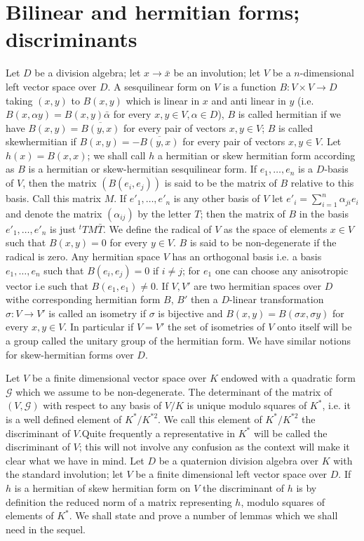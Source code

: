  \section{Bilinear and hermitian forms; discriminants}\label{chap2:sec2.6}
 
 Let $D$ be a division algebra; let $x \rightarrow \bar{x}$ be an
 involution; let $V$ be a $n$-dimensional left vector space over
 $D$. A sesquilinear form on $V$ is a function $B:V \times V
 \rightarrow D$  taking $(x,y)$ to $B(x,y)$ which is linear in $x$ and
 anti linear in $y$ (i.e. $B(x,\alpha y)=B(x,y) \bar{\alpha}$ for every
 $x,y \in V, \alpha \in D$), $B$ is called hermitian if we have
 $B(x,y)=\overline{B(y,x)}$ for every pair of vectors $x,y \in V$; $B$
 is called skew\pageoriginale hermitian if $B(x,y)=
 -\overline{B(y,x)}$ for every 
 pair of vectors  $x,y \in V$. Let $h(x) =B(x,x)$; we shall call $h$ a
 hermitian or skew hermitian form according as $B$ is a hermitian or
 skew-hermitian sesquilinear form. If $e_1,\ldots, e_n$ is a $D$-basis of
 $V$, then the matrix $(B(e_i,e_j))$ is said to be the matrix of $B$
 relative to this basis. Call this matrix $M$. If $e'_1, \ldots,e'_n$
 is any other basis of $V$ let $e'_i = \sum\limits_{i=1}^{n}
 \alpha_{ji}e_i$ and denote the matrix $(\alpha_{ij})$  by the
 letter $T$; then the matrix of $B$ in the basis $e'_1 , \ldots,e'_n$
 is just ${}^t TM \bar{T}$. We define the radical of $V$ as the space
 of elements $x \in V$ such  that $B(x,y)=0$ for every $y \in V$. $B$
 is said to be non-degenerate if the radical is zero. Any hermitian
 space $V$ has an orthogonal basis i.e. a basis $e_1,\ldots, e_n$ such
 that $B(e_i,e_j)=0$  if $i \neq j$; for $e_1$ one can choose any
 anisotropic vector i.e such that $B(e_1,e_1) \neq 0$. If $V,V'$ are
 two hermitian spaces over $D$ withe corresponding hermitian form
 $B$, $B'$ then a $D$-linear transformation $\sigma :V \rightarrow V'$ is
 called an isometry if $\sigma$ is bijective and $B(x,y)=B(\sigma
 x,\sigma y)$ for every  $x,y \in V$. In particular if $V=V'$ the set
 of isometries of $V$ onto itself will be a group called the unitary
 group of the hermitian form. 
 We have similar notions for skew-hermitian forms over $D$.
 
 Let $V$ be a finite dimensional vector space over $K$ endowed with a
 quadratic form $\mathscr{G}$ which we assume to be
 non-degenerate. The determinant of the matrix of $(V, \mathscr{G})$
 with respect to any basis of $V/K$ is unique modulo squares of $K^*$,
 i.e. it is a well defined element of $K^*/K^{*2}$. We call this
 element of $K^*/K^{*2}$ the discriminant of $V$.\pageoriginale Quite
 frequently a 
 representative in $K^*$ will be called the discriminant of $V$; this
 will not involve any confusion as the context will make it clear what
 we have in mind. Let $D$ be a quaternion division algebra over $K$
 with the standard involution; let $V$ be a finite dimensional left
 vector space over $D$. If $h$ is a hermitian of skew hermitian form
 on $V$ the discriminant of $h$ is by definition the reduced norm of
 a matrix representing $h$, modulo squares of elements of $K^*$. We
 shall state and prove a number of lemmas which we shall need in the
 sequel. 

